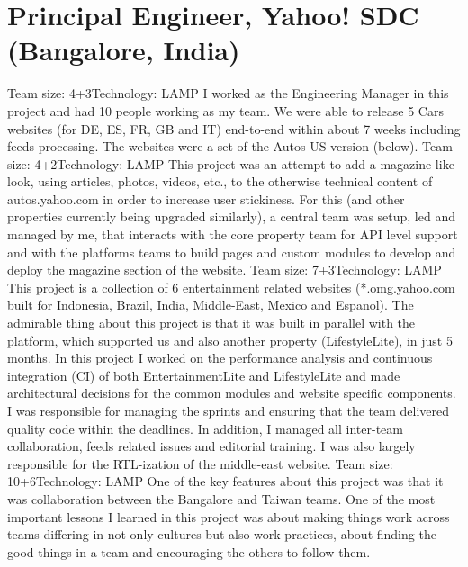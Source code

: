 \section{Principal Engineer, Yahoo! SDC (Bangalore, India)}
         {Team size: 4+3}{Technology: LAMP}
         {I worked as the Engineering Manager in this project and had 10 people working as my team.
We were able to release 5 Cars websites (for DE, ES, FR, GB and IT) end-to-end within about 7
weeks including feeds processing. The websites were a set of the Autos US version (below).}
         {Team size: 4+2}{Technology: LAMP}
         {This project was an attempt to add a magazine like look, using articles, photos, videos, etc., to
the otherwise technical content of autos.yahoo.com in order to increase user stickiness. For
this (and other properties currently being upgraded similarly), a central team was setup, led
and managed by me, that interacts with the core property team for API level support and with
the platforms teams to build pages and custom modules to develop and deploy the magazine
section of the website.}
         {Team size: 7+3}{Technology: LAMP}
         {This project is a collection of 6 entertainment related websites (*.omg.yahoo.com built for
Indonesia, Brazil, India, Middle-East, Mexico and Espanol). The admirable thing about this
project is that it was built in parallel with the platform, which supported us and also another
property (LifestyleLite), in just 5 months. In this project I worked on the performance
analysis and continuous integration (CI) of both EntertainmentLite and LifestyleLite and
made architectural decisions for the common modules and website specific components. I was
responsible for managing the sprints and ensuring that the team delivered quality code within
the deadlines. In addition, I managed all inter-team collaboration, feeds related issues and
editorial training. I was also largely responsible for the RTL-ization of the middle-east website.}
         {Team size: 10+6}{Technology: LAMP}
         {One of the key features about this project was that it was collaboration between the
Bangalore and Taiwan teams. One of the most important lessons I learned in this
project was about making things work across teams differing in not only cultures but also
work practices, about finding the good things in a team and encouraging the others to follow
them.}
